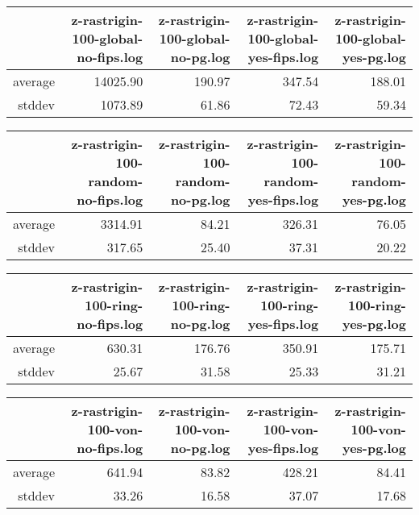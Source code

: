 \begin{table}[ht]
\centering
\begin{tabular}{rrrrr}
  \hline
 & z-rastrigin-100-global-no-fips.log & z-rastrigin-100-global-no-pg.log & z-rastrigin-100-global-yes-fips.log & z-rastrigin-100-global-yes-pg.log \\ 
  \hline
average & 14025.90 & 190.97 & 347.54 & 188.01 \\ 
  stddev & 1073.89 & 61.86 & 72.43 & 59.34 \\ 
   \hline
\end{tabular}
\end{table}
\begin{table}[ht]
\centering
\begin{tabular}{rrrrr}
  \hline
 & z-rastrigin-100-random-no-fips.log & z-rastrigin-100-random-no-pg.log & z-rastrigin-100-random-yes-fips.log & z-rastrigin-100-random-yes-pg.log \\ 
  \hline
average & 3314.91 & 84.21 & 326.31 & 76.05 \\ 
  stddev & 317.65 & 25.40 & 37.31 & 20.22 \\ 
   \hline
\end{tabular}
\end{table}
\begin{table}[ht]
\centering
\begin{tabular}{rrrrr}
  \hline
 & z-rastrigin-100-ring-no-fips.log & z-rastrigin-100-ring-no-pg.log & z-rastrigin-100-ring-yes-fips.log & z-rastrigin-100-ring-yes-pg.log \\ 
  \hline
average & 630.31 & 176.76 & 350.91 & 175.71 \\ 
  stddev & 25.67 & 31.58 & 25.33 & 31.21 \\ 
   \hline
\end{tabular}
\end{table}
\begin{table}[ht]
\centering
\begin{tabular}{rrrrr}
  \hline
 & z-rastrigin-100-von-no-fips.log & z-rastrigin-100-von-no-pg.log & z-rastrigin-100-von-yes-fips.log & z-rastrigin-100-von-yes-pg.log \\ 
  \hline
average & 641.94 & 83.82 & 428.21 & 84.41 \\ 
  stddev & 33.26 & 16.58 & 37.07 & 17.68 \\ 
   \hline
\end{tabular}
\end{table}
